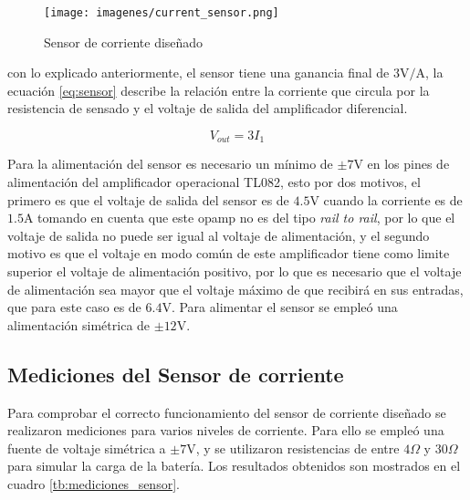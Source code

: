     \begin{figure}[H]
        \centering
        \texttt{[image: imagenes/current\_sensor.png]}
        \caption{Sensor de corriente diseñado}
        \label{fig:sensor_corriente}
    \end{figure}

    con lo explicado anteriormente, el sensor tiene una ganancia final de 
    $3\text{V/A}$, la ecuación \ref{eq:sensor} describe la relación entre
    la corriente que circula por la resistencia de sensado y el voltaje de salida
    del amplificador diferencial.

    \begin{equation}
        V_{out} = 3I_1
        \label{eq:sensor}
    \end{equation}
    
    Para la alimentación del sensor es necesario un mínimo de $\pm7\text{V}$ en
    los pines de alimentación del amplificador operacional TL082, esto por dos 
    motivos, el primero es que el voltaje de salida del sensor es de $4.5\text{V}$
    cuando la corriente es de $1.5\text{A}$ tomando en cuenta que este opamp 
    no es del tipo \textit{rail to rail}, por lo que el voltaje de salida no
    puede ser igual al voltaje de alimentación, y el segundo motivo es que el
    voltaje en modo común de este amplificador tiene como limite superior el
    voltaje de alimentación positivo, por lo que es necesario que el voltaje 
    de alimentación sea mayor que el voltaje máximo de que recibirá en sus entradas,
    que para este caso es de $6.4\text{V}$. Para alimentar el sensor se empleó
    una alimentación simétrica de $\pm 12\text{V}$.
    
    \subsection{Mediciones del Sensor de corriente}

    Para comprobar el correcto funcionamiento del sensor de corriente diseñado
    se realizaron mediciones para varios niveles de corriente. Para ello se
    empleó una fuente de voltaje simétrica a $\pm7\text{V}$, y se utilizaron resistencias de entre 
    $4\Omega$ y $30\Omega$ para simular la carga de la batería. Los resultados 
    obtenidos son mostrados en el cuadro \ref{tb:mediciones_sensor}. 

